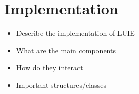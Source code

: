 \chapter{Implementation}
\label{ch:implementation}
\begin{itemize}
    \item Describe the implementation of LUIE
    \item What are the main components
    \item How do they interact
    \item Important structures/classes
\end{itemize}